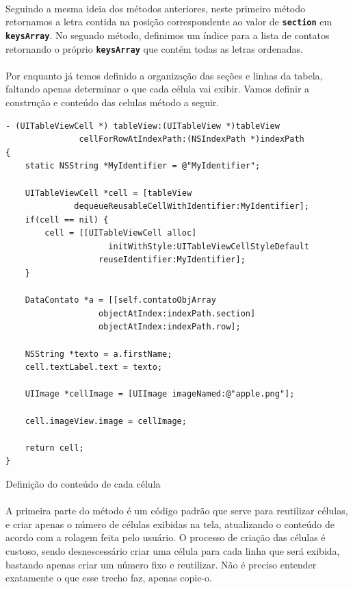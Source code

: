 \documentclass[a4paper,12pt,brazil,doubleside]{book}
\begin{document}
\begin{singlespace}
\paragraph{}Seguindo a mesma ideia dos métodos anteriores, neste primeiro método retornamos a letra contida na posição correspondente ao valor de \texttt{\textbf{section}} em \texttt{\textbf{keysArray}}. No segundo método, definimos um índice para a lista de contatos retornando o próprio \texttt{\textbf{keysArray}} que contém todas as letras ordenadas.
\paragraph{}Por enquanto já temos definido a organização das seções e linhas da tabela, faltando apenas determinar o que cada célula vai exibir. Vamos definir a construção e conteúdo das celulas método a seguir.

\begin{listing}[H]
\begin{verbatim}
- (UITableViewCell *) tableView:(UITableView *)tableView
               cellForRowAtIndexPath:(NSIndexPath *)indexPath
{
    static NSString *MyIdentifier = @"MyIdentifier";
    
    UITableViewCell *cell = [tableView 
              dequeueReusableCellWithIdentifier:MyIdentifier];
    if(cell == nil) {
        cell = [[UITableViewCell alloc] 
                     initWithStyle:UITableViewCellStyleDefault
                   reuseIdentifier:MyIdentifier];
    }

    DataContato *a = [[self.contatoObjArray
                   objectAtIndex:indexPath.section]
                   objectAtIndex:indexPath.row];

    NSString *texto = a.firstName;
    cell.textLabel.text = texto;
        
    UIImage *cellImage = [UIImage imageNamed:@"apple.png"];
        
    cell.imageView.image = cellImage;
    
    return cell;
}
\end{verbatim}
\caption{Definição do conteúdo de cada célula}
\end{listing}

\paragraph{}A primeira parte do método é um código padrão que serve para reutilizar células, e criar apenas o número de células exibidas na tela, atualizando o conteúdo de acordo com a rolagem feita pelo usuário. O processo de criação das células é custoso, sendo desnescessário criar uma célula para cada linha que será exibida, bastando apenas criar um número fixo e reutilizar. Não é preciso entender exatamente o que esse trecho faz, apenas copie-o.

\end{singlespace}
\end{document}
